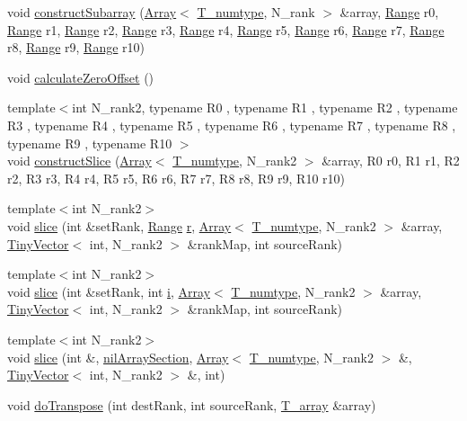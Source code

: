 \begin{DoxyCompactItemize}
\item 
void \hyperlink{classArray_a61e8715866c5b2de855f54793cd7b59b}{construct\+Subarray} (\hyperlink{classArray}{Array}$<$ \hyperlink{classArray_ae72770f4a1d2f8b7193badafc320f008}{T\+\_\+numtype}, N\+\_\+rank $>$ \&array, \hyperlink{classRange}{Range} r0, \hyperlink{classRange}{Range} r1, \hyperlink{classRange}{Range} r2, \hyperlink{classRange}{Range} r3, \hyperlink{classRange}{Range} r4, \hyperlink{classRange}{Range} r5, \hyperlink{classRange}{Range} r6, \hyperlink{classRange}{Range} r7, \hyperlink{classRange}{Range} r8, \hyperlink{classRange}{Range} r9, \hyperlink{classRange}{Range} r10)
\item 
void \hyperlink{classArray_a34294eb964088dd307f1f82a3d5b493c}{calculate\+Zero\+Offset} ()
\item 
{\footnotesize template$<$int N\+\_\+rank2, typename R0 , typename R1 , typename R2 , typename R3 , typename R4 , typename R5 , typename R6 , typename R7 , typename R8 , typename R9 , typename R10 $>$ }\\void \hyperlink{classArray_aeb41b68d9898dc92ac0eff2944fc0ad8}{construct\+Slice} (\hyperlink{classArray}{Array}$<$ \hyperlink{classArray_ae72770f4a1d2f8b7193badafc320f008}{T\+\_\+numtype}, N\+\_\+rank2 $>$ \&array, R0 r0, R1 r1, R2 r2, R3 r3, R4 r4, R5 r5, R6 r6, R7 r7, R8 r8, R9 r9, R10 r10)
\item 
{\footnotesize template$<$int N\+\_\+rank2$>$ }\\void \hyperlink{classArray_a9c32831b4938cc29366464c558470982}{slice} (int \&set\+Rank, \hyperlink{classRange}{Range} \hyperlink{indexexpr_8h_ac434fd11cc2493608d8d91424d60c17e}{r}, \hyperlink{classArray}{Array}$<$ \hyperlink{classArray_ae72770f4a1d2f8b7193badafc320f008}{T\+\_\+numtype}, N\+\_\+rank2 $>$ \&array, \hyperlink{classTinyVector}{Tiny\+Vector}$<$ int, N\+\_\+rank2 $>$ \&rank\+Map, int source\+Rank)
\item 
{\footnotesize template$<$int N\+\_\+rank2$>$ }\\void \hyperlink{classArray_a63448322dc4b4a83586b50a237f850e1}{slice} (int \&set\+Rank, int \hyperlink{indexexpr_8h_aabd77643995707c185e95c8cb2782c81}{i}, \hyperlink{classArray}{Array}$<$ \hyperlink{classArray_ae72770f4a1d2f8b7193badafc320f008}{T\+\_\+numtype}, N\+\_\+rank2 $>$ \&array, \hyperlink{classTinyVector}{Tiny\+Vector}$<$ int, N\+\_\+rank2 $>$ \&rank\+Map, int source\+Rank)
\item 
{\footnotesize template$<$int N\+\_\+rank2$>$ }\\void \hyperlink{classArray_a394370ea8abe027caa2a3711d8b09307}{slice} (int \&, \hyperlink{classnilArraySection}{nil\+Array\+Section}, \hyperlink{classArray}{Array}$<$ \hyperlink{classArray_ae72770f4a1d2f8b7193badafc320f008}{T\+\_\+numtype}, N\+\_\+rank2 $>$ \&, \hyperlink{classTinyVector}{Tiny\+Vector}$<$ int, N\+\_\+rank2 $>$ \&, int)
\item 
void \hyperlink{classArray_a5903cff358e066b56a0ddf49adf534e1}{do\+Transpose} (int dest\+Rank, int source\+Rank, \hyperlink{classArray_a6a3d9b6a214107a10df219091801f1e0}{T\+\_\+array} \&array)
\end{DoxyCompactItemize}
